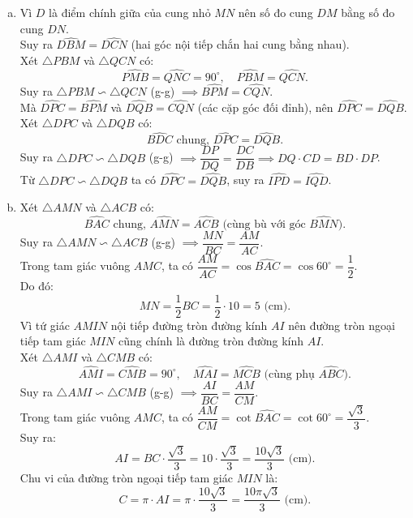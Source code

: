 \begin{bt}
{\begin{enumerate}[a)]
    Trong tam giác $ABC$, hai đường cao $BN$ và $CM$ cắt nhau tại $I$, do đó $I$ là trực tâm của tam giác $ABC$.\\
    Suy ra $AI \perp BC$.\\
    Tứ giác $AM I N$ có $\widehat{AM I} = \widehat{AN I} = 90^\circ$, nên $\widehat{AM I} + \widehat{AN I} = 180^\circ$.\\
    Do đó tứ giác $AM I N$ nội tiếp đường tròn đường kính $AI$.
    \item Vì $D$ là điểm chính giữa của cung nhỏ $MN$ nên số đo cung $DM$ bằng số đo cung $DN$.\\
    Suy ra $\widehat{DBM} = \widehat{DCN}$ (hai góc nội tiếp chắn hai cung bằng nhau).\\
    Xét $\triangle PBM$ và $\triangle QCN$ có:
    $$\widehat{PMB} = \widehat{QNC} = 90^\circ, \quad \widehat{PBM} = \widehat{QCN}.$$
    Suy ra $\triangle PBM \backsim \triangle QCN$ (g-g) $\implies \widehat{BPM} = \widehat{CQN}$.\\
    Mà $\widehat{DPC} = \widehat{BPM}$ và $\widehat{DQB} = \widehat{CQN}$ (các cặp góc đối đỉnh), nên $\widehat{DPC} = \widehat{DQB}$.\\
    Xét $\triangle DPC$ và $\triangle DQB$ có:
    $$\widehat{BDC}\text{ chung, } \widehat{DPC} = \widehat{DQB}.$$
    Suy ra $\triangle DPC \backsim \triangle DQB$ (g-g) $\implies \dfrac{DP}{DQ} = \dfrac{DC}{DB} \implies DQ \cdot CD = BD \cdot DP$.\\
    Từ $\triangle DPC \backsim \triangle DQB$ ta có $\widehat{DPC} = \widehat{DQB}$, suy ra $\widehat{IPD} = \widehat{IQD}$.
    \item Xét $\triangle AMN$ và $\triangle ACB$ có:
    $$\widehat{BAC}\text{ chung, } \widehat{AMN} = \widehat{ACB}\text{ (cùng bù với góc } \widehat{BMN}\text{)}.$$
    Suy ra $\triangle AMN \backsim \triangle ACB$ (g-g) $\implies \dfrac{MN}{BC} = \dfrac{AM}{AC}$.\\
    Trong tam giác vuông $AMC$, ta có $\dfrac{AM}{AC} = \cos \widehat{BAC} = \cos 60^\circ = \dfrac{1}{2}$.\\
    Do đó:
    $$MN = \dfrac{1}{2}BC = \dfrac{1}{2} \cdot 10 = 5\text{ (cm)}.$$
    Vì tứ giác $AM I N$ nội tiếp đường tròn đường kính $AI$ nên đường tròn ngoại tiếp tam giác $MIN$ cũng chính là đường tròn đường kính $AI$.\\
    Xét $\triangle AMI$ và $\triangle CMB$ có:
    $$\widehat{AMI} = \widehat{CMB} = 90^\circ, \quad \widehat{MAI} = \widehat{MCB}\text{ (cùng phụ } \widehat{ABC}\text{)}.$$
    Suy ra $\triangle AMI \backsim \triangle CMB$ (g-g) $\implies \dfrac{AI}{BC} = \dfrac{AM}{CM}$.\\
    Trong tam giác vuông $AMC$, ta có $\dfrac{AM}{CM} = \cot \widehat{BAC} = \cot 60^\circ = \dfrac{\sqrt{3}}{3}$.\\
    Suy ra:
    $$AI = BC \cdot \dfrac{\sqrt{3}}{3} = 10 \cdot \dfrac{\sqrt{3}}{3} = \dfrac{10\sqrt{3}}{3}\text{ (cm)}.$$
    Chu vi của đường tròn ngoại tiếp tam giác $MIN$ là:
    $$C = \pi \cdot AI = \pi \cdot \dfrac{10\sqrt{3}}{3} = \dfrac{10\pi\sqrt{3}}{3}\text{ (cm)}.$$
\end{enumerate}
}
\end{bt}

